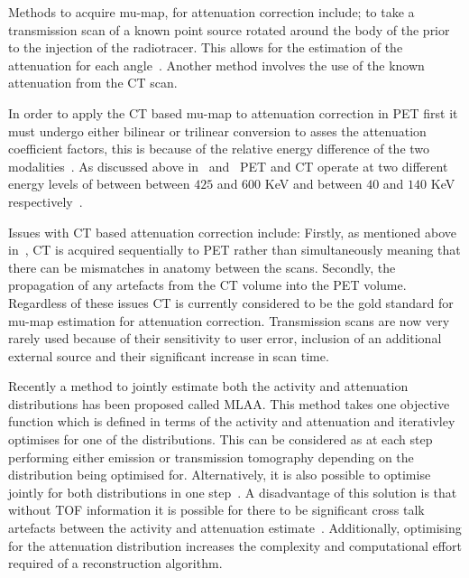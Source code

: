                 Methods to acquire \gls{mu-map}, for attenuation correction include; to take a transmission scan of a known point source rotated around the body of the  prior to the injection of the radiotracer. This allows for the estimation of the attenuation for each angle~. Another method involves the use of the known attenuation from the \gls{CT} scan.
                
                In order to apply the \gls{CT} based \gls{mu-map} to attenuation correction in \gls{PET} first it must undergo either bilinear or trilinear conversion to asses the attenuation coefficient factors, this is because of the relative energy difference of the two modalities~. As discussed above in~ and~ \gls{PET} and \gls{CT} operate at two different energy levels of between between $425$ and $600$ \gls{KeV} and between $40$ and $140$ \gls{KeV} respectively~.
                
                Issues with \gls{CT} based attenuation correction include: Firstly, as mentioned above in~, \gls{CT} is acquired sequentially to \gls{PET} rather than simultaneously meaning that there can be mismatches in anatomy between the scans. Secondly, the propagation of any artefacts from the \gls{CT} volume into the \gls{PET} volume. Regardless of these issues \gls{CT} is currently considered to be the gold standard for \gls{mu-map} estimation for attenuation correction. Transmission scans are now very rarely used because of their sensitivity to user error, inclusion of an additional external source and their significant increase in scan time.
                
                Recently a method to jointly estimate both the activity and attenuation distributions has been proposed called \gls{MLAA}. This method takes one objective function which is defined in terms of the activity and attenuation and iterativley optimises for one of the distributions. This can be considered as at each step performing either emission or transmission tomography depending on the distribution being optimised for. Alternatively, it is also possible to optimise jointly for both distributions in one step~. A disadvantage of this solution is that without \gls{TOF} information it is possible for there to be significant cross talk artefacts between the activity and attenuation estimate~. Additionally, optimising for the attenuation distribution increases the complexity and computational effort required of a reconstruction algorithm.
                
